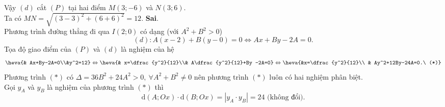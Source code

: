 \begin{ex}
{\begin{itemchoice}
			Vậy $(d)$ cắt $(P)$ tại hai điểm $M(3;-6)$ và  $N(3;6)$.\\
			Ta có $MN=\sqrt{(3-3)^2+(6+6)^2}=12$. 
			\itemch \textbf{Sai}.\\ Phương trình đường thẳng đi qua $I(2;0)$ có  dạng (với $A^2+B^2>0$) $$(d) \colon A(x-2)+B(y-0)=0\Leftrightarrow Ax+By-2A=0.$$
			Tọa độ giao điểm của $(P)$ và $(d)$ là nghiệm của hệ $$\heva{& Ax+By-2A=0\\&y^2=12}\Leftrightarrow \heva{&  x=\dfrac{y^2}{12}\\& A\dfrac{y^2}{12}+By -2A=0}\Leftrightarrow \heva{&x=\dfrac{y^2}{12}\\ & Ay^2+12By-24A=0.\ (*)}$$
			Phương trình  $(*)$ có $\Delta =36B^2+24A^2>0, \ \forall A^2+B^2\ne 0$ nên phương trình $(*)$ luôn có hai nghiệm phân biệt.\\
			Gọi $y_A$ và $y_B$ là nghiệm của phương trình  $(*)$ thì $$\mathrm{d}(A;Ox)\cdot \mathrm{d}(B;Ox)=|y_A\cdot y_B|=24\text{ (không đổi)}.$$
		\end{itemchoice}
	 }
\end{ex}



